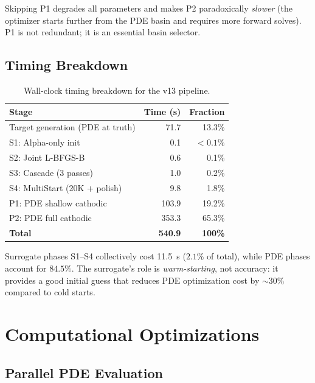 \documentclass[11pt,a4paper]{article}
\begin{document}
Skipping P1 degrades all parameters and makes P2 paradoxically
\emph{slower} (the optimizer starts further from the PDE basin and
requires more forward solves). P1 is not redundant; it is an essential
basin selector.

\subsection{Timing Breakdown}\label{sec:timing}

\begin{table}[H]
\centering
\caption{Wall-clock timing breakdown for the v13 pipeline.}
\label{tab:timing}
\begin{tabular}{lrr}
\toprule
Stage & Time (s) & Fraction \\
\midrule
Target generation (PDE at truth) & 71.7 & 13.3\% \\
S1: Alpha-only init & 0.1 & $<0.1\%$ \\
S2: Joint L-BFGS-B & 0.6 & 0.1\% \\
S3: Cascade (3 passes) & 1.0 & 0.2\% \\
S4: MultiStart (20K + polish) & 9.8 & 1.8\% \\
\midrule
P1: PDE shallow cathodic & 103.9 & 19.2\% \\
P2: PDE full cathodic & 353.3 & 65.3\% \\
\midrule
\textbf{Total} & \textbf{540.9} & \textbf{100\%} \\
\bottomrule
\end{tabular}
\end{table}

Surrogate phases S1--S4 collectively cost \SI{11.5}{\second} ($2.1\%$ of
total), while PDE phases account for $84.5\%$. The surrogate's role is
\emph{warm-starting}, not accuracy: it provides a good initial guess that
reduces PDE optimization cost by $\sim\!30\%$ compared to cold starts.


\section{Computational Optimizations}\label{sec:optimizations}

\subsection{Parallel PDE Evaluation}\label{sec:parallel}
\end{document}
